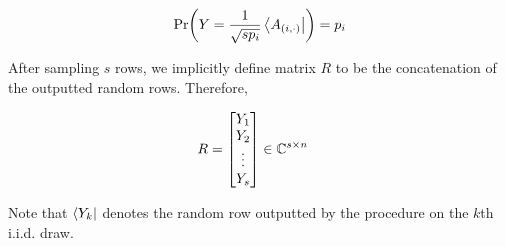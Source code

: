 \documentclass[main.tex]{subfiles}
\begin{document}
\begin{align*}
\Pr(Y = \frac{1}{\sqrt{s p_i}} \bra{A_{(i, \cdot)}}) = p_i
\end{align*}


After sampling $s$ rows, we implicitly define matrix $R$ to be the concatenation of the outputted random rows. Therefore,

\begin{align}
\label{def:R}
R &= \begin{bmatrix}
Y_1 \\
Y_2 \\
\vdots \\
Y_s
\end{bmatrix} \in \mathbb{C}^{s \times n}
\end{align}

Note that $\bra{Y_k}$ denotes the random row outputted by the procedure on the $k$th i.i.d. draw.
\end{document}
